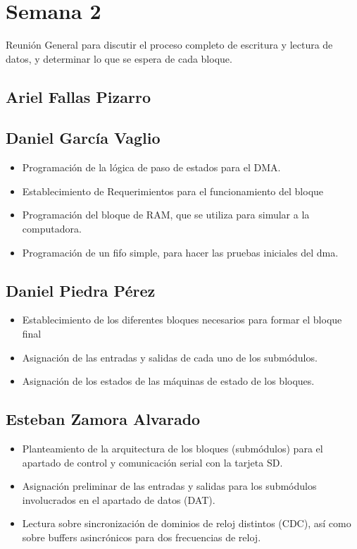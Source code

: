 \newpage
\section{Semana 2}

Reunión General para discutir el proceso completo de escritura y lectura de datos, y determinar lo
que se espera de cada bloque. 
\subsection{Ariel Fallas Pizarro}


\subsection{Daniel García Vaglio}
\begin{itemize}
\item Programación de la lógica de paso de estados para el DMA.
\item Establecimiento de Requerimientos para el funcionamiento del bloque
\item Programación del bloque de RAM, que se utiliza para simular a la computadora. 
\item Programación de un fifo simple, para hacer las pruebas iniciales del dma.
\end{itemize}


\subsection{Daniel Piedra Pérez}
\begin{itemize}
\item Establecimiento de los diferentes bloques necesarios para formar el bloque final
\item Asignación de las entradas y salidas de cada uno de los submódulos.
\item Asignación de los estados de las máquinas de estado de los bloques.
\end{itemize}

\subsection{Esteban Zamora Alvarado}
\begin{itemize}
\item Planteamiento de la arquitectura de los bloques (submódulos) para el apartado de control y
comunicación serial con la tarjeta SD.
\item Asignación preliminar de las entradas y salidas para los submódulos involucrados en el
  apartado de datos (DAT).
\item Lectura sobre sincronización de dominios de reloj distintos (CDC), así como sobre buffers
  asincrónicos para dos frecuencias de reloj.
\end{itemize}
\newpage
